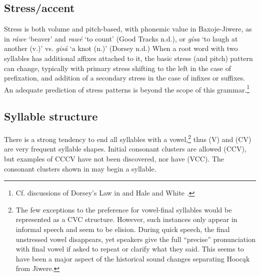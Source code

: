 \documentclass[output=paper]{LSP/langsci}
\begin{document}
\subsection{Stress/accent} 
Stress is both volume and pitch-based, with phonemic value in Baxoje-Jiwere, as in \textit{ráwe} `beaver' and \textit{raw\'e} `to count' (Good Tracks n.d.), or \textit{g\'isa} `to laugh at another (v.)' vs. \textit{gisá}  `a knot (n.)'  (Dorsey n.d.)   When a root word with two syllables has additional affixes attached to it, the basic stress (and pitch) pattern can change, typically with primary stress shifting to the left in the case of prefixation, and addition of a secondary stress in the case of infixes or suffixes.  An adequate prediction of stress patterns is beyond the scope of this grammar.\footnote{Cf. discussions of Dorsey's Law in \citet{Miner1979} and Hale and White \citet{Eagle1980}.} 

\subsection{Syllable structure} There is a strong tendency to end all syllables with a vowel,\footnote{The few exceptions to the preference for vowel-final syllables would be represented as a CVC structure. However, such instances only appear in informal speech and seem to be elision. During quick speech, the final unstressed vowel disappears, yet speakers give the full ``precise'' pronunciation with final vowel if asked to repeat or clarify what they said. This seems to have been a major aspect of the historical sound changes separating Hooc\k{a}k from Jiwere.} thus (V) and (CV) are very frequent syllable shapes. Initial consonant clusters are allowed (CCV), but examples of CCCV have not been discovered, nor have (VCC).  The consonant clusters shown in  may begin a syllable. 
\end{document}
